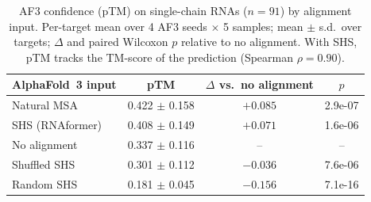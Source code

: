 \begin{table}[t]
\centering
\caption{AF3 confidence (pTM) on single-chain RNAs ($n{=}91$) by alignment input. Per-target mean over 4 AF3 seeds $\times$ 5 samples; mean $\pm$ s.d.\ over targets; $\Delta$ and paired Wilcoxon $p$ relative to no alignment. With SHS, pTM tracks the TM-score of the prediction (Spearman $\rho{=}0.90$).}
\label{tab:confidence}
\begin{tabular}{lccc}
\toprule
AlphaFold~3 input & pTM & $\Delta$ vs.\ no alignment & $p$ \\
\midrule
Natural MSA & 0.422 $\pm$ 0.158 & $+0.085$ & 2.9e-07 \\
SHS (RNAformer) & 0.408 $\pm$ 0.149 & $+0.071$ & 1.6e-06 \\
No alignment & 0.337 $\pm$ 0.116 & -- & -- \\
Shuffled SHS & 0.301 $\pm$ 0.112 & $-0.036$ & 7.6e-06 \\
Random SHS & 0.181 $\pm$ 0.045 & $-0.156$ & 7.1e-16 \\
\bottomrule
\end{tabular}
\end{table}
